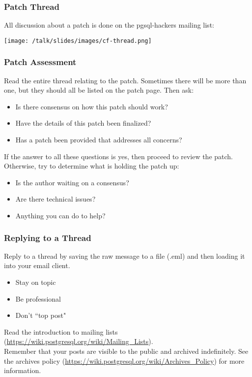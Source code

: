 \begin{frame}
    \frametitle{Patch Thread}

    All discussion about a patch is done on the pgsql-hackers mailing list:

    \texttt{[image: /talk/slides/images/cf-thread.png]}
\end{frame}

\begin{frame}
    \frametitle{Patch Assessment}

    Read the entire thread relating to the patch.  Sometimes there will be more than one, but they should all be listed on the patch page.  Then ask:\pause

    \begin{itemize}
        \item Is there consensus on how this patch should work?\pause
        \item Have the details of this patch been finalized?\pause
        \item Has a patch been provided that addresses all concerns?\pause
    \end{itemize}

    If the answer to all these questions is yes, then proceed to review the patch.  Otherwise, try to determine what is holding the patch up:\pause

    \begin{itemize}
        \item Is the author waiting on a consensus?\pause
        \item Are there technical issues?\pause
        \item Anything you can do to help?
    \end{itemize}
\end{frame}

\begin{frame}
    \frametitle{Replying to a Thread}

    Reply to a thread by saving the raw message to a file (.eml) and then loading it into your email client.\pause

    \begin{itemize}
        \item Stay on topic\pause
        \item Be professional\pause
        \item Don't ``top post"\pause
    \end{itemize}

    Read the introduction to mailing lists (\url{https://wiki.postgresql.org/wiki/Mailing_Lists}).\pause\\
    \vspace{1em}
    Remember that your posts are visible to the public and archived indefinitely. See the archives policy (\url{https://wiki.postgresql.org/wiki/Archives_Policy}) for more information.
\end{frame}

